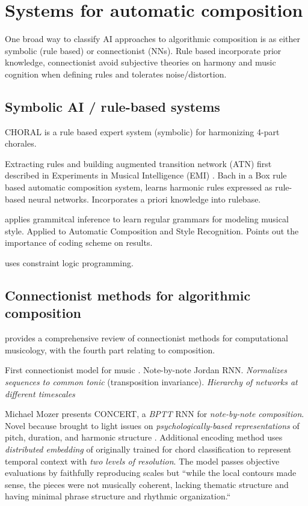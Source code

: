 \documentclass[dissertation.tex]{subfiles}
\begin{document}
\section{Systems for automatic composition}

One broad way to classify AI approaches to algorithmic composition is as either
symbolic (rule based) or connectionist (NNs)\cite{toiviainen2000symbolic}.
Rule based incorporate prior knowledge, connectionist avoid subjective theories
on harmony and music cognition when defining rules and tolerates noise/distortion.

\subsection{Symbolic AI / rule-based systems}

CHORAL \cite{ebciouglu1988expert} is a rule based expert system (symbolic) for
harmonizing 4-part chorales.

Extracting rules and building augmented transition network (ATN) first
described in Experiments in Musical Intelligence (EMI) \cite{cope1992computer}.
Bach in a Box \cite{spangler1998bach} rule based automatic composition system,
learns harmonic rules expressed as rule-based neural networks. Incorporates a
priori knowledge into rulebase.

\cite{cruz1998learning} applies grammitcal inference to learn regular grammars
for modeling musical style. Applied to Automatic Composition and Style
Recognition. Points out the importance of coding scheme on results.

\cite{tsang1991harmonizing} uses constraint logic programming.

\subsection{Connectionist methods for algorithmic composition}

\cite{griffith1999musical} provides a comprehensive review of connectionist
methods for computational musicology, with the fourth part relating to
composition.

First connectionist model for music \cite{todd1988sequential}
\cite{todd1989connectionist} \cite{bharucha1989modeling}. Note-by-note Jordan
RNN. \emph{Normalizes sequences to common tonic} (transposition invariance).
\emph{Hierarchy of networks at different timescales}

Michael Mozer \cite{mozer1994neural} presents CONCERT, a \emph{BPTT} RNN
for \emph{note-by-note composition}. Novel because brought to light issues on
\emph{psychologically-based representations} of pitch, duration, and harmonic
structure \cite{shepard1982geometrical}. Additional encoding method uses
\emph{distributed embedding} of \cite{laden1989representation} originally trained for
chord classification  to represent temporal
context with \emph{two levels of resolution}. The model passes objective evaluations
by faithfully reproducing scales but ``while the local contours made sense, the
pieces were not musically coherent, lacking thematic structure and having
minimal phrase structure and rhythmic organization.``
\end{document}

